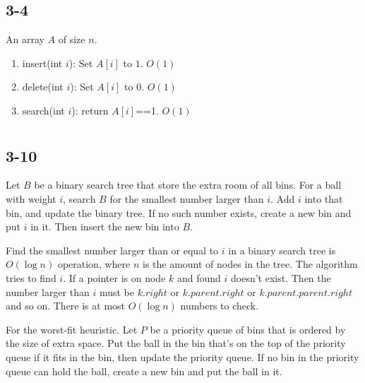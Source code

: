 \documentclass[letter]{article}
\begin{document}
\newpage
\section{}
\subsection*{3-4}
An array $A$ of size $n$.
\begin{enumerate}
 \item insert(int $i$): Set $A[i]$ to $1$. $O(1)$
 \item delete(int $i$): Set $A[i]$ to $0$. $O(1)$
 \item search(int $i$): return $A[i]$==1. $O(1)$
\end{enumerate}

\newpage
\section{}
\subsection*{3-10}

Let $B$ be a binary search tree that store the extra room of all bins. For a ball with weight $i$, search $B$ for the smallest number larger than $i$. Add $i$ into that bin, and update the binary tree. If no such number exists, create a new bin and put $i$ in it. Then insert the new bin into $B$.

Find the smallest number larger than or equal to $i$ in a binary search tree is $O(\log n)$ operation, where $n$ is the amount of nodes in the tree. The algorithm tries to find $i$. If a pointer is on node $k$ and found $i$ doesn't exist. Then the number larger than $i$ must be $k.right$ or $k.parent.right$ or $k.parent.parent.right$ and so on. There is at most $O(\log n)$ numbers to check.

For the worst-fit heuristic. Let $P$ be a priority queue of bins that is ordered by the size of extra space. Put the ball in the bin that's on the top of the priority queue if it fits in the bin, then update the priority queue. If no bin in the priority queue can hold the ball, create a new bin and put the ball in it.

\newpage
\section{}
\end{document}
